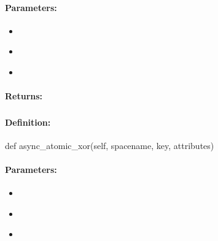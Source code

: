 \paragraph{Parameters:}
\begin{itemize}[noitemsep]
\item {}\\

\item {}\\

\item {}\\

\end{itemize}

\paragraph{Returns:}


\pagebreak
\subsubsection{}
\label{api:python:async_atomic_xor}


\paragraph{Definition:}
\begin{pythoncode}
def async_atomic_xor(self, spacename, key, attributes)
\end{pythoncode}

\paragraph{Parameters:}
\begin{itemize}[noitemsep]
\item {}\\

\item {}\\

\item {}\\

\end{itemize}

